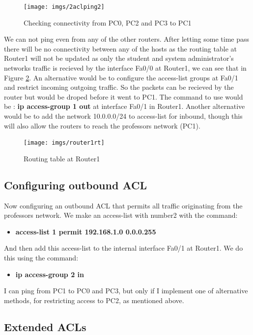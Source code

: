 \documentclass{article}
\begin{document}
\begin{figure}[h]
\centering
\texttt{[image: imgs/2aclping2]}
\caption{Checking connectivity from PC0, PC2 and PC3 to PC1}
\label{fig:2aclping2}
\end{figure}

We can not ping even from any of the other routers. After letting some time pass there will be no connectivity between any of the hosts as the routing table at Router1 will not be updated as only the student and system administrator's networks traffic is recieved by the interface Fa0/0 at Router1, we can see that in Figure \ref{fig:router1rt}. An alternative would be to configure the access-list groups at Fa0/1 and restrict incoming outgoing traffic. So the packets can be recieved by the router but would be droped before it went to PC1. The command to use would be : \textbf{ip access-group 1 out} at interface Fa0/1 in Router1. Another alternative would be to add the network 10.0.0.0/24 to access-list for inbound, though this will also allow the routers to reach the professors network (PC1).

\begin{figure}[h]
\centering
\texttt{[image: imgs/router1rt]}
\caption{Routing table at Router1}
\label{fig:router1rt}
\end{figure}

\subsection{Configuring outbound ACL}
Now configuring an outbound ACL that permits all traffic originating from the professors network.  We make an access-list with number2 with the command:
\begin{itemize}
\item \textbf{access-list 1 permit 192.168.1.0 0.0.0.255}
\end{itemize}
And then add this access-list to the internal interface Fa0/1 at Router1. We do this using the command: 
\begin{itemize}
\item \textbf{ip access-group 2 in}
\end{itemize}


I can ping from PC1 to PC0 and PC3, but only if I implement one of alternative methods, for restricting access to PC2, as mentioned above.

\subsection{Extended ACLs}
\end{document}
